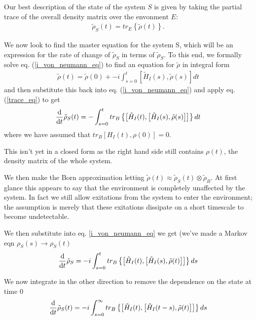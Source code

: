 Our best description of the state of the system $S$ is given by taking the partial trace of the overall density matrix over the envonment $E$:
\begin{align}
  \label{trace_eq}
  \tilde{\rho}_S(t) = tr_E\left\{\tilde{\rho}(t)\right\}.
\end{align}

We now look to find the master equation for the system S, which will be an expression for the rate of change of $\tilde{\rho}_S$ in terms of $\tilde{\rho}_S$. To this end, we formally solve eq. (\ref{i_von_neumann_eq}) to find an equation for $\tilde{\rho}$ in integral form
\begin{align}
  \tilde{\rho}(t) = \tilde{\rho}(0) + -i\int_{s=0}^t \left[ \tilde{H}_I(s), \tilde{\rho}(s) \right] dt
\end{align}
and then substitute this back into eq. (\ref{i_von_neumann_eq}) and apply eq. (\ref{trace_eq}) to get
\begin{align}
  \frac{\mathrm{d}}{\mathrm{d}t} \tilde{\rho}_S(t) = -\int_{s=0}^t tr_B\left\{ \left[ \tilde{H}_I(t), \left[ \tilde{H}_I(s), \tilde{\rho}(s) \right] \right] \right\} dt
\end{align}
where we have assumed that $tr_B [H_I(t), \rho(0)] = 0$.


This isn't yet in a closed form as the right hand side still contains $\rho(t)$, the density matrix of the whole system.

We then make the Born approximation letting $\tilde{\rho}(t) \approx \tilde{\rho}_S(t) \otimes \tilde{\rho}_B$. At first glance this appears to say that the environment is completely unaffected by the system. In fact we still allow exitations from the system to enter the environment; the assumption is merely that these exitations dissipate on a short timescale to become undetectable.

We then substitute into eq. \ref{i_von_neumann_eq} we get (we've made a Markov eqn $\rho_S(s) \rightarrow \rho_S(t)$
\begin{align}
  \frac{\mathrm{d}}{\mathrm{d}t} \tilde{\rho}_S = -i \int_{s=0}^t tr_B\left\{\left[ \tilde{H}_I(t), \left[ \tilde{H}_I(s), \tilde{\rho}(t) \right] \right]\right\} ds
\end{align}

We now integrate in the other direction to remove the dependence on the state at time $0$
\begin{align}
  \frac{\mathrm{d}}{\mathrm{d}t} \tilde{\rho}_S(t) = -i \int_{s=0}^\infty tr_B\left\{\left[ \tilde{H}_I(t), \left[ \tilde{H}_I(t-s), \tilde{\rho}(t) \right] \right]\right\} ds
\end{align}

